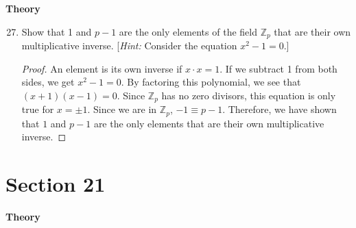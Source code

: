 \documentclass[12pt, oneside]{book}
\newcommand{\Z}{\mathbb{Z}}
\newcommand{\pf}[1]{
    \begin{customframedproof}[linecolor=orangehdx!75]
        \begin{proof}
        #1
        \end{proof}
    \end{customframedproof}
}
\begin{document}
\textbf{Theory}

\begin{enumerate}
    \setcounter{enumi}{26}
    \item Show that 1 and \(p - 1\) are the only elements of the field \(\Z_{p}\) that are their own multiplicative inverse. [\textit{Hint:} Consider the equation \(x^{2} - 1 = 0\).]
          \pf{
            An element is its own inverse if \(x \cdot x = 1\). If we subtract 1 from both sides, we get \(x^{2} - 1 = 0\). By factoring this polynomial, we see that \((x + 1)(x - 1) = 0\). Since \(\Z_{p}\) has no zero divisors, this equation is only true for \(x = \pm 1\). Since we are in \(\Z_{p}\), \(-1 \equiv p - 1\). Therefore, we have shown that \(1\) and \(p - 1\) are the only elements that are their own multiplicative inverse.
          }
\end{enumerate}

\newpage

\section*{Section 21}
\textbf{Theory}
\end{document}

